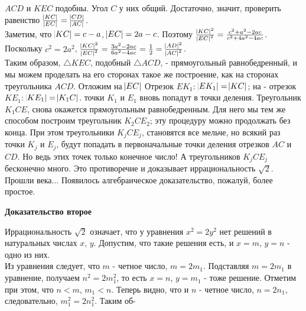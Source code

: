 \vspace{10em}
\noindent $ACD$ и $KEC$ подобны. Угол $C$ у них общий. Достаточно, значит, проверить равенство $\frac{\abs{KC}}{\abs{EC}}=\frac{\abs{CD}}{\abs{AC}}$.\\
\indent Заметим, что $\abs{KC}= c - a$, $\abs{EC} = 2a - c$. Поэтому $\frac{\abs{KC}^2}{\abs{EC}^2} = \frac{c^2 + a^2 - 2ac}{c^2 + 4a^2 - 4ac}$. Поскольку $c^2 = 2a^2$, $\frac{\abs{KC}^2}{\abs{EC}^2} = \frac{3a^2 - 2ac}{6a^2 - 4ac} = \frac{1}{2} = \frac{\abs{AD}^2}{\abs{AC}^2}$.\\
Таким образом, $\triangle KEC$, подобный $\triangle ACD$, - прямоугольный равнобедренный, и мы можем проделать на его сторонах такое же построение, как на сторонах треугольника $ACD$. Отложим на $\abs{EC}$ Отрезок $EK_1$: $\abs{EK_1} = \abs{KC}$; на  - отрезок $KE_1$: $\abs{KE_1} = \abs{K_1C}$. точки $K_1$ и $E_1$ вновь попадут в точки деления. Треугольник $K_1CE$, снова окажется прямоугольным равнобедренным. Для него мы тем же способом построим треугольник $K_2CE_2$; эту процедуру можно продолжать без конца. При этом треугольники $K_jCE_j$, становятся все мельче, но всякий раз точки $K_j$ и $E_j$, будут попадать в первоначальные точки деления отрезков $AC$ и $CD$. Но ведь этих точек только конечное число! А треугольников $K_jCE_j$ бесконечно много. Это противоречие и доказывает иррациональность $\sqrt{2}$.\\
\indent Прошли века... Появилось алгебраическое доказательство, пожалуй, более простое.

\vspace{1em}

\noindent\textbf{Доказательство второе}
\vspace{0.3em}


\noindent Иррациональность $\sqrt{2}$ означает, что у уравнения $x^2 = 2y^2$ нет решений в натуральных числах $x$, $y$. Допустим, что такие решения есть, и $x = m$, $y = n$ - одно из них.\\
\indent Из уравнения следует, что $m$ - четное число, $m = 2m_1$. Подставляя $m = 2m_1$ в уравнение, получаем $n^2 = 2m^2_1$, то есть $x = n$, $y = m_1$ - тоже решение. Отметим при этом, что $n < m$, $m_1 < n$. Теперь видно, что и $n$ - четное число, $n = 2n_1$, следовательно, $m^2_1 = 2n^2_1$. Таким об-